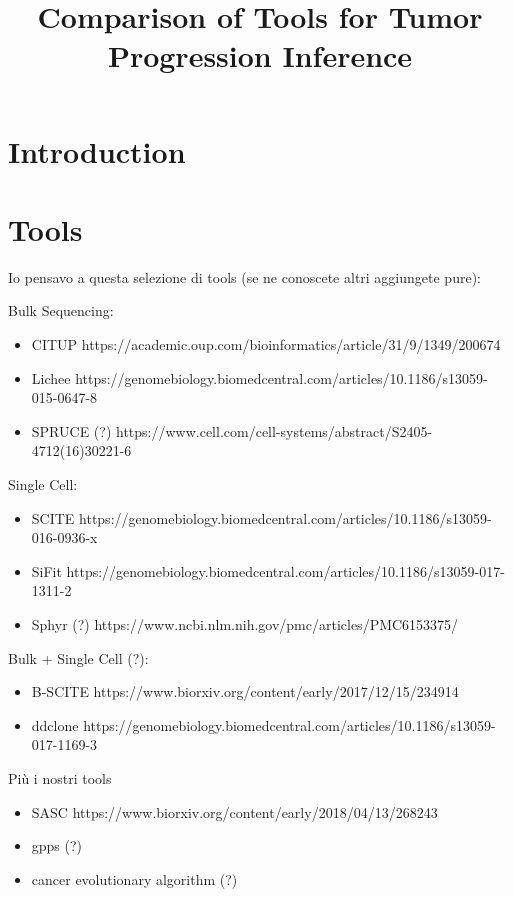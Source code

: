 \documentclass{article}
\title{Comparison of Tools for Tumor Progression Inference}
\author{}
\date{}
\begin{document}
\maketitle

\section{Introduction}

\section{Tools}
Io pensavo a questa selezione di tools (se ne conoscete altri aggiungete pure):

Bulk Sequencing:
\begin{itemize}
\item CITUP https://academic.oup.com/bioinformatics/article/31/9/1349/200674
\item Lichee https://genomebiology.biomedcentral.com/articles/10.1186/s13059-015-0647-8
\item SPRUCE (?) https://www.cell.com/cell-systems/abstract/S2405-4712(16)30221-6
\end{itemize}

Single Cell:
\begin{itemize}
\item SCITE https://genomebiology.biomedcentral.com/articles/10.1186/s13059-016-0936-x
\item SiFit https://genomebiology.biomedcentral.com/articles/10.1186/s13059-017-1311-2
\item Sphyr (?) https://www.ncbi.nlm.nih.gov/pmc/articles/PMC6153375/
\end{itemize}

Bulk + Single Cell (?):
\begin{itemize}
\item B-SCITE https://www.biorxiv.org/content/early/2017/12/15/234914
\item ddclone https://genomebiology.biomedcentral.com/articles/10.1186/s13059-017-1169-3
\end{itemize}

Più i nostri tools
\begin{itemize}
\item SASC https://www.biorxiv.org/content/early/2018/04/13/268243
\item gpps (?)
\item cancer evolutionary algorithm (?)
\end{itemize}
\end{document}
